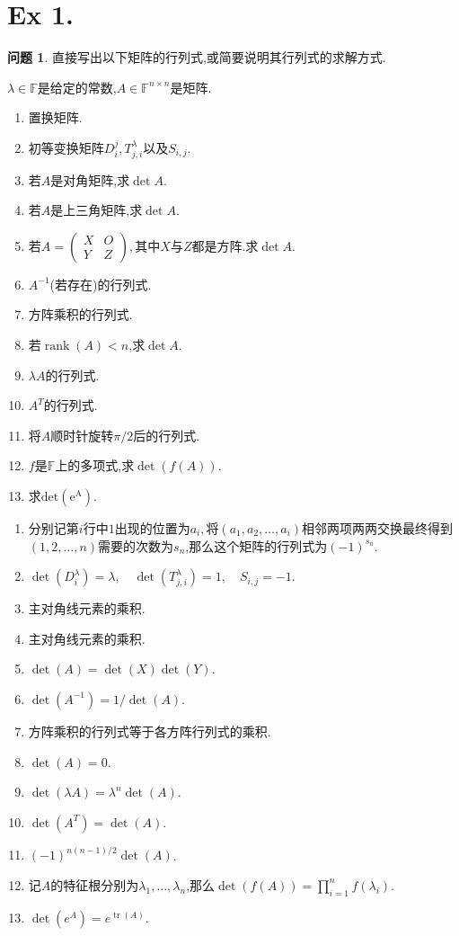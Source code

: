 \documentclass[11pt]{ctexart}
\theoremstyle{definition}
\newtheorem{qqq}{问题}[section]
\numberwithin{equation}{section}
\newcommand{\op}[1]{\operatorname{#1}}%
\begin{document}
\section{Ex 1.}
\begin{qqq}
    直接写出以下矩阵的行列式,或简要说明其行列式的求解方式.
\begin{qing}
    $\lambda\in \mathbb{F}$是给定的常数,$A\in \mathbb{F}^{n\times n}$是矩阵.
\end{qing}
\begin{enumerate}
    \item 置换矩阵.
    \item 初等变换矩阵$D_i^j,T_{j,i}^\lambda$以及$S_{i,j}$.
    \item 若$A$是对角矩阵,求$\op{det}A$.
    \item 若$A$是上三角矩阵,求$\op{det}A$.
    \item 若$A=\begin{pmatrix}X&O\\Y&Z \end{pmatrix},$其中$X$与$Z$都是方阵.求$\op{det}A$.
    \item $A^{-1}$(若存在)的行列式.
    \item 方阵乘积的行列式.
    \item 若$\op{rank}(A)<n$,求$\op{det}A$.
    \item $\lambda A$的行列式.
    \item $A^T$的行列式.
    \item 将$A$顺时针旋转$\pi /2$后的行列式.
    \item $f$是$\mathbb{F}$上的多项式,求$\op{det}(f(A))$.
    \item 求$\op{det(e^A)}$.
\end{enumerate}
\end{qqq}
\begin{aaa}
    \begin{enumerate}
        \item 分别记第$i$行中$1$出现的位置为$a_i,$将$(a_1,a_2,\ldots,a_i)$相邻两项两两交换最终得到$(1,2,\ldots,n)$需要的次数为$s_n$,那么这个矩阵的行列式为$(-1)^{s_n}$.
        \item $\op{det}(D^\lambda_i)=\lambda,\quad \op{det}(T^\lambda_{j,i})=1,\quad S_{i,j}=-1.$
        \item 主对角线元素的乘积.
        \item 主对角线元素的乘积.
        \item $\op{det}(A)=\op{det}(X)\op{det}(Y)$.
        \item $\op{det}(A^{-1})=1/{\op{det}(A)}$.
        \item 方阵乘积的行列式等于各方阵行列式的乘积.
        \item $\op{det}(A)=0$.
        \item $\op{det}(\lambda A)=\lambda^n \op{det}(A)$.
        \item $\op{det}(A^T)=\op{det}(A)$.
        \item $(-1)^{n(n-1)/2}\op{det}(A)$.
        \item 记$A$的特征根分别为$\lambda_1,\ldots,\lambda_n$,那么$\op{det}(f(A))=\prod\limits _{i=1}^n f(\lambda_i)$.
        \item $\op{det}(e^A)=e^{\op{tr}(A)}.$
    \end{enumerate}
\end{aaa}
\end{document}
